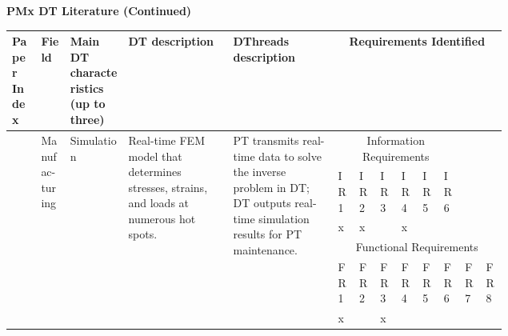 \documentclass[runningheads]{llncs}
\begin{document}
\begin{landscape}
\begin{small}
\begin{longtable}
\end{longtable}
\end{small}

\newpage
        \textbf{PMx DT Literature (Continued)}
        \vspace{2mm}
        
        \begin{small}
    \begin{longtable}{p{0.05\linewidth}p{0.05\linewidth}p{0.1\linewidth}p{0.18\linewidth}p{0.18\linewidth}p{0.02\linewidth}p{0.02\linewidth}p{0.02\linewidth}p{0.02\linewidth}p{0.02\linewidth}p{0.02\linewidth}p{0.02\linewidth}p{0.02\linewidth}}
    \bottomrule

    
        Paper Index & Field & Main DT characteristics (up to three) & DT description & DThreads description & \multicolumn{8}{c}{Requirements Identified} \\\bottomrule
        
        \vspace{3mm}
        \multirow{6}{=}{\cite{moi2020twin}} & \multirow{6}{=}{Manufac-turing} &  \multirow{6}{=}{Simulation} & \multirow{6}{=}{Real-time FEM model that determines stresses, strains, and loads at numerous hot spots.} & \multirow{6}{=}{PT transmits real-time data to solve the inverse problem in DT; DT outputs real-time simulation results for PT maintenance.} & \multicolumn{6}{c}{Information Requirements} & &  \\\cmidrule{6-11}
        & & & & & IR1 & IR2 & IR3 & IR4 & IR5 & IR6 & & \\\cmidrule{6-11}
        & & & & & x & x &  & x &  & & & \\\cmidrule{6-13}
        \vspace{3mm}
        & & & & & \multicolumn{8}{c}{Functional Requirements} \\\cmidrule{6-13}
        & & & & & FR1 & FR2 & FR3 & FR4 & FR5 & FR6 & FR7 & FR8 \\\cmidrule{6-13}
        & & & & & x &  & x &  &  &  & & \\\bottomrule
        

\end{longtable}
\end{small}
\end{landscape}
\end{document}
